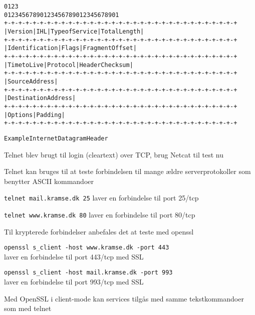 \documentclass[Screen16to9,17pt]{foils}
\begin{document}

\begin{alltt}
\small
    0                   1                   2                   3
    0 1 2 3 4 5 6 7 8 9 0 1 2 3 4 5 6 7 8 9 0 1 2 3 4 5 6 7 8 9 0 1
   +-+-+-+-+-+-+-+-+-+-+-+-+-+-+-+-+-+-+-+-+-+-+-+-+-+-+-+-+-+-+-+-+
   |Version|  IHL  |Type of Service|          Total Length         |
   +-+-+-+-+-+-+-+-+-+-+-+-+-+-+-+-+-+-+-+-+-+-+-+-+-+-+-+-+-+-+-+-+
   |         Identification        |Flags|      Fragment Offset    |
   +-+-+-+-+-+-+-+-+-+-+-+-+-+-+-+-+-+-+-+-+-+-+-+-+-+-+-+-+-+-+-+-+
   |  Time to Live |    Protocol   |         Header Checksum       |
   +-+-+-+-+-+-+-+-+-+-+-+-+-+-+-+-+-+-+-+-+-+-+-+-+-+-+-+-+-+-+-+-+
   |                       Source Address                          |
   +-+-+-+-+-+-+-+-+-+-+-+-+-+-+-+-+-+-+-+-+-+-+-+-+-+-+-+-+-+-+-+-+
   |                    Destination Address                        |
   +-+-+-+-+-+-+-+-+-+-+-+-+-+-+-+-+-+-+-+-+-+-+-+-+-+-+-+-+-+-+-+-+
   |                    Options                    |    Padding    |
   +-+-+-+-+-+-+-+-+-+-+-+-+-+-+-+-+-+-+-+-+-+-+-+-+-+-+-+-+-+-+-+-+

                    Example Internet Datagram Header
\end{alltt}




\begin{list1}
\item Telnet blev brugt til login (cleartext) over TCP, brug Netcat til test nu
\item Telnet kan bruges til at teste forbindelsen til mange ældre serverprotokoller som benytter ASCII kommandoer
\begin{list2}
\item \verb+telnet mail.kramse.dk 25+ laver en forbindelse til port 25/tcp
\item \verb+telnet www.kramse.dk 80+ laver en forbindelse til port 80/tcp
\end{list2}
\item Til krypterede forbindelser anbefales det at teste med openssl
\begin{list2}
\item \verb+openssl s_client -host www.kramse.dk -port 443+\\
laver en forbindelse til port 443/tcp med SSL
\item \verb+openssl s_client -host mail.kramse.dk -port 993+\\
 laver en forbindelse til port 993/tcp med SSL
\end{list2}
\item Med OpenSSL i client-mode kan services tilgås med samme tekstkommandoer som med telnet
\end{list1}
\end{document}
